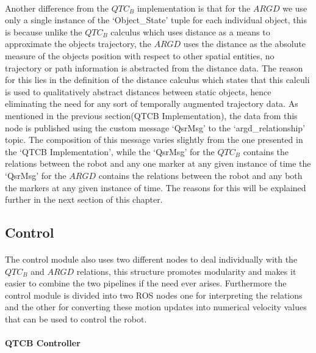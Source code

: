 \paragraph{}Another difference from the $QTC_B$ implementation is that for the $ARGD$ we use only a single instance of the `Object\_State' tuple for each individual object, this is because unlike the $QTC_B$ calculus which uses distance as a means to approximate the objects trajectory, the $ARGD$ uses the distance as the absolute measure of the objects position with respect to other spatial entities, no trajectory or path information is abstracted from the distance data. The reason for this lies in the definition of the distance calculus which states that this calculi is used to qualitatively abstract distances between static objects, hence eliminating the need for any sort of temporally augmented trajectory data. As mentioned in the previous section(QTCB Implementation), the data from this node is published using the custom message `QsrMsg' to the `argd\_relationship' topic. The composition of this message varies slightly from the one presented in the `QTCB Implementation', while the `QsrMsg' for the $QTC_B$ contains the relations between the robot and any one marker at any given instance of time the `QsrMsg' for the $ARGD$ contains the relations between the robot and any both the markers at any given instance of time. The reasons for this will be explained further in the next section of this chapter.

\subsection{Control}
\paragraph{}The control module also uses two different nodes to deal individually with the $QTC_B$ and $ARGD$ relations, this structure promotes modularity and makes it easier to combine the two pipelines if the need ever arises. Furthermore the control module is divided into two ROS nodes one for interpreting the relations and the other for converting these motion updates into numerical velocity values that can be used to control the robot.

\paragraph{QTCB Controller}

